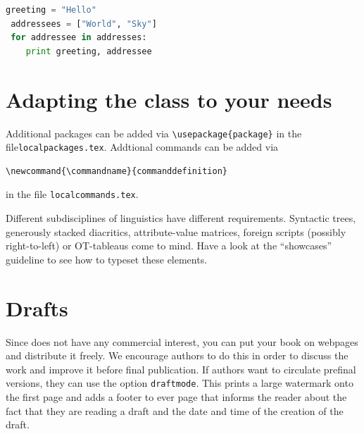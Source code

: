 \begin{lstlisting}[language=Python, stringstyle=\color{blue}]
 greeting = "Hello"
 addressees = ["World", "Sky"]
 for addressee in addresses:
    print greeting, addressee
\end{lstlisting}

\largerpage[2]
\section{Adapting the class to your needs}
Additional packages can be added via \verb+\usepackage{package}+ in the file\linebreak \verb+localpackages.tex+.
Addtional commands can be added via \begin{verbatim}\newcommand{\commandname}{commanddefinition}\end{verbatim} in the file \verb+localcommands.tex+.
\clearpage


Different subdisciplines of linguistics have different requirements. Syntactic trees, generously stacked diacritics, attribute-value matrices, foreign scripts (possibly right-to-left) or OT-tableaus come to mind. Have a look at the ``showcases'' guideline to see how to typeset these elements.




\section{Drafts}

Since \lsp does not have any commercial interest, you can put your book on webpages and distribute it
freely. We encourage authors to do this in order to discuss the work and improve it before final
publication. If authors want to circulate prefinal versions, they can use the option
\texttt{draftmode}. This prints a large watermark onto the first page and adds a footer to ever page
that informs the reader about the fact that they are reading a draft and the date and time of the
creation of the draft.

